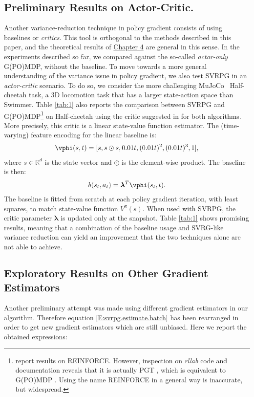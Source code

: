 \subsection{Preliminary Results on Actor-Critic.}\label{subsec:actorcritic} %
Another variance-reduction technique in policy gradient consists of using baselines or \textit{critics}. This tool is orthogonal to the methods described in this paper, and the theoretical results of \hyperref[chap:convergence]{Chapter 4} are general in this sense. In the experiments described so far, we compared against the so-called \textit{actor-only} G(PO)MDP, \ie without the baseline. To move towards a more general understanding of the variance issue in policy gradient, we also test \acs{SVRPG} in an \textit{actor-critic} scenario. To do so, we consider the more challenging MuJoCo~\citep{todorov2012mujoco} Half-cheetah task, a 3D locomotion task that has a larger state-action space than Swimmer. Table \ref{tab:1} also reports the comparison between \acs{SVRPG} and G(PO)MDP\footnote{\citet{duan2016benchmarking} report results on REINFORCE. However, inspection on \textit{rllab} code and documentation reveals that it is actually \ac{PGT} \cite{sutton2000policy}, which is equivalent to G(PO)MDP \citep[shown by][]{peters2008reinforcement}. Using the name REINFORCE in a general way is inaccurate, but widespread.} on Half-cheetah using the critic suggested in \cite{duan2016benchmarking} for both algorithms. More precisely, this critic is a linear state-value function estimator. 
The (time-varying) feature encoding for the linear baseline is:
\begin{align*}
\vphi(s,t)=[s, s \odot s, 0.01t, (0.01t)^2, (0.01t)^3,1],
\end{align*}
where $s\in\mathbb{R}^d$ is the state vector and $\odot$ is the element-wise product. The baseline is then:
\[
b(s_t,a_t) = \boldsymbol{\lambda}^T\vphi(s_t,t).
\]
The baseline is fitted from scratch at each policy gradient iteration, with least squares, to match state-value function $V^{\pi}(s)$.
When used with \acs{SVRPG}, the critic parameter $\boldsymbol{\lambda}$ is updated only at the snapshot. Table \ref{tab:1} shows promising results, meaning that a combination of the baseline usage and \acs{SVRG}-like variance reduction can yield an improvement that the two techniques alone are not able to achieve.
\subsection{Exploratory Results on Other Gradient Estimators}
Another preliminary attempt was made using different gradient estimators in our algorithm. Therefore equation \eqref{E:svrpg.estimate.batch} has been rearranged in order to get new gradient estimators which are still unbiased. Here we report the obtained expressions:



